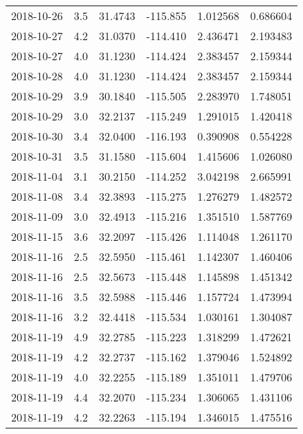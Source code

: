 \begin{tabular}{lrrrrr}
2018-10-26 &       3.5 &  31.4743 &  -115.855 &         1.012568 &         0.686604 \\
2018-10-27 &       4.2 &  31.0370 &  -114.410 &         2.436471 &         2.193483 \\
2018-10-27 &       4.0 &  31.1230 &  -114.424 &         2.383457 &         2.159344 \\
2018-10-28 &       4.0 &  31.1230 &  -114.424 &         2.383457 &         2.159344 \\
2018-10-29 &       3.9 &  30.1840 &  -115.505 &         2.283970 &         1.748051 \\
2018-10-29 &       3.0 &  32.2137 &  -115.249 &         1.291015 &         1.420418 \\
2018-10-30 &       3.4 &  32.0400 &  -116.193 &         0.390908 &         0.554228 \\
2018-10-31 &       3.5 &  31.1580 &  -115.604 &         1.415606 &         1.026080 \\
2018-11-04 &       3.1 &  30.2150 &  -114.252 &         3.042198 &         2.665991 \\
2018-11-08 &       3.4 &  32.3893 &  -115.275 &         1.276279 &         1.482572 \\
2018-11-09 &       3.0 &  32.4913 &  -115.216 &         1.351510 &         1.587769 \\
2018-11-15 &       3.6 &  32.2097 &  -115.426 &         1.114048 &         1.261170 \\
2018-11-16 &       2.5 &  32.5950 &  -115.461 &         1.142307 &         1.460406 \\
2018-11-16 &       2.5 &  32.5673 &  -115.448 &         1.145898 &         1.451342 \\
2018-11-16 &       3.5 &  32.5988 &  -115.446 &         1.157724 &         1.473994 \\
2018-11-16 &       3.2 &  32.4418 &  -115.534 &         1.030161 &         1.304087 \\
2018-11-19 &       4.9 &  32.2785 &  -115.223 &         1.318299 &         1.472621 \\
2018-11-19 &       4.2 &  32.2737 &  -115.162 &         1.379046 &         1.524892 \\
2018-11-19 &       4.0 &  32.2255 &  -115.189 &         1.351011 &         1.479706 \\
2018-11-19 &       4.4 &  32.2070 &  -115.234 &         1.306065 &         1.431106 \\
2018-11-19 &       4.2 &  32.2263 &  -115.194 &         1.346015 &         1.475516 \\

\end{tabular}
